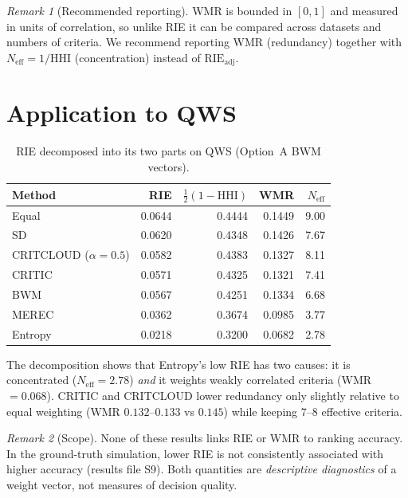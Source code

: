 \documentclass[11pt]{article}
\theoremstyle{definition}
\theoremstyle{remark}
\newtheorem{remark}{Remark}
\begin{document}
\begin{remark}[Recommended reporting]
WMR is bounded in $[0,1]$ and measured in units of correlation, so unlike RIE it can be compared
across datasets and numbers of criteria. We recommend reporting WMR (redundancy) together with
$N_{\mathrm{eff}}=1/\mathrm{HHI}$ (concentration) instead of $\mathrm{RIE}_{\mathrm{adj}}$.
\end{remark}

\section{Application to QWS}

\begin{table}[h]
\centering
\caption{RIE decomposed into its two parts on QWS (Option~A BWM vectors).}
\begin{tabular}{lrrrr}
\toprule
Method & RIE & $\tfrac12(1-\mathrm{HHI})$ & WMR & $N_{\mathrm{eff}}$\\
\midrule
Equal & 0.0644 & 0.4444 & 0.1449 & 9.00\\
SD & 0.0620 & 0.4348 & 0.1426 & 7.67\\
CRITCLOUD ($\alpha=0.5$) & 0.0582 & 0.4383 & 0.1327 & 8.11\\
CRITIC & 0.0571 & 0.4325 & 0.1321 & 7.41\\
BWM & 0.0567 & 0.4251 & 0.1334 & 6.68\\
MEREC & 0.0362 & 0.3674 & 0.0985 & 3.77\\
Entropy & 0.0218 & 0.3200 & 0.0682 & 2.78\\
\bottomrule
\end{tabular}
\end{table}

\noindent The decomposition shows that Entropy's low RIE has two causes: it is concentrated
($N_{\mathrm{eff}}=2.78$) \emph{and} it weights weakly correlated criteria (WMR $=0.068$).
CRITIC and CRITCLOUD lower redundancy only slightly relative to equal weighting
(WMR $0.132$--$0.133$ vs $0.145$) while keeping 7--8 effective criteria.

\begin{remark}[Scope]
None of these results links RIE or WMR to ranking accuracy. In the ground-truth simulation, lower RIE
is not consistently associated with higher accuracy (results file S9). Both quantities are
\emph{descriptive diagnostics} of a weight vector, not measures of decision quality.
\end{remark}
\end{document}
